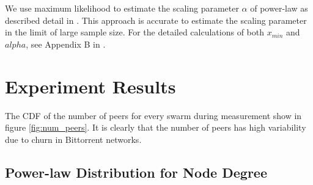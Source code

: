 \documentclass[10pt,conference,letterpaper]{IEEEtran}
\begin{document}

We use maximum likelihood to estimate the scaling parameter $\alpha$ of power-law as described detail in \cite{clauset2009power}.  
This approach is accurate to estimate the scaling parameter in the limit of large sample size. 
For the detailed calculations of both $x_{min}$ and $alpha$, see Appendix B in \cite{clauset2009power}.

\section{Experiment Results}\label{result}
The CDF of the number of peers for every swarm during measurement show in figure \ref{fig:num_peers}. 
It is clearly that the number of peers has high variability due to churn in Bittorrent networks. 

\subsection{Power-law Distribution for Node Degree}
\end{document}
